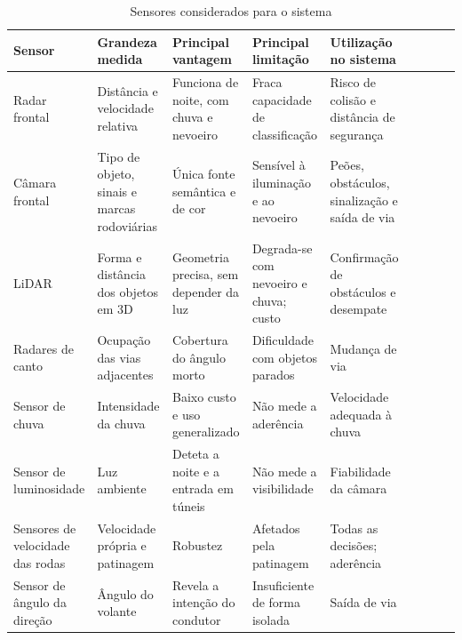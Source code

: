 \begin{table}[H]
  \centering
  \caption{Sensores considerados para o sistema}
  \label{tab:sensores}
  \footnotesize
  \renewcommand{\arraystretch}{1.1}
  \begin{tabularx}{\textwidth}{@{}L{2.3cm}V
      >{\raggedright\arraybackslash}XV
      >{\raggedright\arraybackslash}XV
      >{\raggedright\arraybackslash}XV
      >{\raggedright\arraybackslash}X@{}}
    \toprule
    \textbf{Sensor} & \textbf{Grandeza medida} & \textbf{Principal vantagem}
      & \textbf{Principal limitação} & \textbf{Utilização no sistema} \\
    \midrule
    Radar frontal
      & Distância e velocidade relativa
      & Funciona de noite, com chuva e nevoeiro
      & Fraca capacidade de classificação
      & Risco de colisão e distância de segurança \\ \linhasep
    Câmara frontal
      & Tipo de objeto, sinais e marcas rodoviárias
      & Única fonte semântica e de cor
      & Sensível à iluminação e ao nevoeiro
      & Peões, obstáculos, sinalização e saída de via \\ \linhasep
    LiDAR
      & Forma e distância dos objetos em 3D
      & Geometria precisa, sem depender da luz
      & Degrada-se com nevoeiro e chuva; custo
      & Confirmação de obstáculos e desempate \\ \linhasep
    Radares de canto
      & Ocupação das vias adjacentes
      & Cobertura do ângulo morto
      & Dificuldade com objetos parados
      & Mudança de via \\ \linhasep
    Sensor de chuva
      & Intensidade da chuva
      & Baixo custo e uso generalizado
      & Não mede a aderência
      & Velocidade adequada à chuva \\ \linhasep
    Sensor de luminosidade
      & Luz ambiente
      & Deteta a noite e a entrada em túneis
      & Não mede a visibilidade
      & Fiabilidade da câmara \\ \linhasep
    Sensores de velocidade das rodas
      & Velocidade própria e patinagem
      & Robustez
      & Afetados pela patinagem
      & Todas as decisões; aderência \\ \linhasep
    Sensor de ângulo da direção
      & Ângulo do volante
      & Revela a intenção do condutor
      & Insuficiente de forma isolada
      & Saída de via \\
    \bottomrule
  \end{tabularx}
\end{table}

